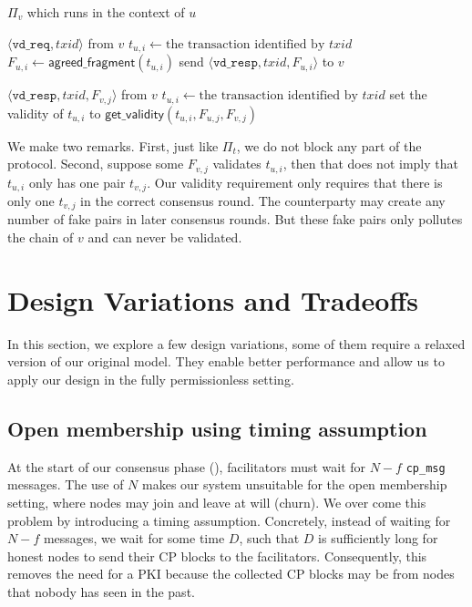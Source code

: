 \begin{algorithm}
\caption{$\Pi_v$ which runs in the context of $u$}
\label{alg:vd-proto}

\begin{algorithmic}
    \Upon $\langle \texttt{vd\_req}, txid \rangle$ from $v$
        \State $t_{u, i} \gets \text{the transaction identified by } txid$
        \State $F_{u, i} \gets \textsf{agreed\_fragment}(t_{u, i})$
        \State send $\langle \texttt{vd\_resp}, txid, F_{u, i} \rangle$ to $v$

    \Upon $\langle \texttt{vd\_resp}, txid, F_{v, j} \rangle$ from $v$
        \State $t_{u, i} \gets \text{the transaction identified by } txid$
            \State set the validity of $t_{u, i}$ to $\textsf{get\_validity}(t_{u, i}, F_{u, j}, F_{v, j})$
        \EndIf
\end{algorithmic}
\end{algorithm}

We make two remarks.
First, just like $\Pi_t$, we do not block any part of the protocol.
Second, suppose some $F_{v, j}$ validates $t_{u, i}$, then that does not imply that $t_{u, i}$ only has one pair $t_{v, j}$.
Our validity requirement only requires that there is only one $t_{v, j}$ in the correct consensus round.
The counterparty may create any number of fake pairs in later consensus rounds.
But these fake pairs only pollutes the chain of $v$ and can never be validated.

\section{Design Variations and Tradeoffs}
\label{sec:tradeoffs}
In this section, 
we explore a few design variations, some of them require a relaxed version of our original model.
They enable better performance and allow us to apply our design in the fully permissionless setting.

\subsection{Open membership using timing assumption}
\label{sec:permissionless}
At the start of our consensus phase (), facilitators must wait for $N-f$ \texttt{cp\_msg} messages.
The use of $N$ makes our system unsuitable for the open membership setting,
where nodes may join and leave at will (churn).
We over come this problem by introducing a timing assumption.
Concretely, instead of waiting for $N-f$ messages, we wait for some time $D$,
such that $D$ is sufficiently long for honest nodes to send their CP blocks to the facilitators.
Consequently, this removes the need for a PKI because the collected CP blocks may be from nodes that nobody has seen in the past.

